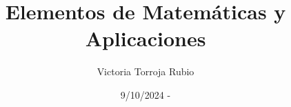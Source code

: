\documentclass{report}
\begin{document}
\title{Elementos de Matemáticas y Aplicaciones}
\author{Victoria Torroja Rubio}
\date{9/10/2024 -}

\maketitle

\tableofcontents

\pagebreak






\end{document}
